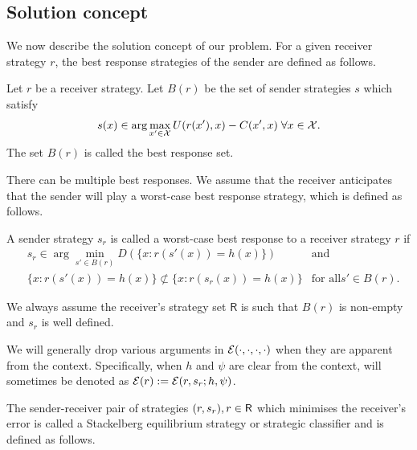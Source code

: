 \subsection{Solution concept}
We now describe the solution concept of our problem. For a given receiver strategy $r$, the best response strategies of the sender are defined as follows.

\begin{defn}\label{defn:Best response} Let $r$ be a receiver strategy. Let $B(r)$ be the set of sender strategies $s$ which satisfy
	\begin{equation*}
		s(x) \in \arg\max_{x' \in \cg{X}} U(r(x'),x) - C(x',x) \; \forall x \in \cg{X}.
	\end{equation*}
	The set $B(r)$ is called the best response set.
\end{defn}

There can be multiple best responses. We assume that the receiver anticipates that the sender will play a worst-case best response strategy, which is defined as follows.
\begin{defn}\label{def:Worst case best response}
	A sender strategy $s_r$ is called a worst-case best response to a receiver strategy $r$ if
	\begin{equation*}
		\begin{aligned}
			&s_r \in  \arg \min_{s' \in B(r)}D(\{x:r(s'(x)) = h(x)\}) &\text{and}\\ &\{x:r(s'(x)) = h(x)\} \not\subset \{x:r(s_r(x)) = h(x)\} &\text{for all} s' \in B(r).
\end{aligned}
\end{equation*}

\end{defn}
\begin{rem}\label{rem:disclaimer}
	We always assume the receiver's strategy set $\mathsf{R}$ is such that $B(r)$ is non-empty and $s_r$ is well defined.
\end{rem}

\begin{notn}
	We will generally drop various arguments in $\mathcal{E}(\cdot,\cdot,\cdot,\cdot)$ when they are apparent from the context. Specifically, when $h$ and $\psi$ are clear from the context, will sometimes be denoted as $\mathcal{E}(r):= \mathcal{E}(r,s_r;h,\psi)$.
\end{notn}
The sender-receiver pair of strategies $(r,s_r), r \in \mathsf{R}$ which minimises the receiver's error is called a Stackelberg equilibrium strategy or strategic classifier and is defined as follows.

